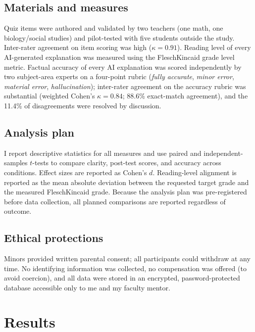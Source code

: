 \documentclass[11pt,letterpaper]{article}
\begin{document}
\subsection{Materials and measures}

Quiz items were authored and validated by two teachers (one math, one
biology/social studies) and pilot-tested with five students outside the study.
Inter-rater agreement on item scoring was high ($\kappa = 0.91$). Reading level
of every AI-generated explanation was measured using the Flesch\textendash Kincaid
grade level metric. Factual accuracy of every AI explanation was scored
independently by two subject-area experts on a four-point rubric (\emph{fully
accurate}, \emph{minor error}, \emph{material error}, \emph{hallucination});
inter-rater agreement on the accuracy rubric was substantial (weighted Cohen's
$\kappa = 0.84$; 88.6\% exact-match agreement), and the 11.4\% of disagreements
were resolved by discussion.

\subsection{Analysis plan}

I report descriptive statistics for all measures and use paired and
independent-samples $t$-tests to compare clarity, post-test scores, and accuracy
across conditions. Effect sizes are reported as Cohen's $d$. Reading-level
alignment is reported as the mean absolute deviation between the requested target
grade and the measured Flesch\textendash Kincaid grade. Because the analysis plan
was pre-registered before data collection, all planned comparisons are reported
regardless of outcome.

\subsection{Ethical protections}

Minors provided written parental consent; all participants could withdraw at
any time. No identifying information was collected, no compensation was offered
(to avoid coercion), and all data were stored in an encrypted, password-protected
database accessible only to me and my faculty mentor.


\section{Results}
\end{document}
